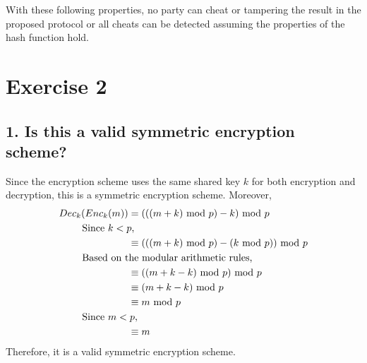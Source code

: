 \documentclass[runningheads]{llncs}
\begin{document}

With these following properties, no party can cheat or tampering the result in the proposed protocol or all cheats can be detected assuming the properties of the hash function hold.

\clearpage
\pagebreak

\section*{Exercise 2}
\subsection*{1. Is this a valid symmetric encryption scheme?}
Since the encryption scheme uses the same shared key $k$ for both encryption and decryption, this is a symmetric encryption scheme.
Moreover,
\begin{align*}
    Dec_k(Enc_k(m)) & = (((m+k)\ \text{mod}\ p) - k)\ \text{mod}\ p \\
    & \text{\hspace{-5em} Since $k < p$,} \\
    & \equiv (((m+k)\ \text{mod}\ p) - (k\ \text{mod}\ p))\ \text{mod}\ p \\
    & \text{\hspace{-5em} Based on the modular arithmetic rules,} \\
    & \equiv ((m+k-k)\ \text{mod}\ p)\ \text{mod}\ p \\
    & \equiv (m+k-k)\ \text{mod}\ p \\
    & \equiv m\ \text{mod}\ p \\
    & \text{\hspace{-5em} Since $m < p$,} \\
    & \equiv m
\end{align*}
Therefore, it is a valid symmetric encryption scheme.
\end{document}
